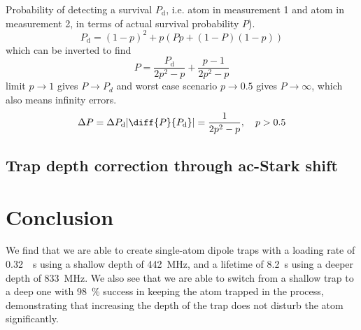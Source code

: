 \documentclass[../Thesis-IJspeert.tex]{subfiles}
\begin{document}
Probability of detecting a survival $P_\text{d}$, i.e. atom in measurement 1 and atom in measurement 2, in terms of actual survival probability $P$).
\begin{equation}
	P_\text{d}=  (1-p)^2 + p\left(Pp + (1-P)(1-p) \right)
\end{equation}
which can be inverted to find
\begin{equation}
	P = \frac{P_\text{d}}{2p^2-p} + \frac{p-1}{2p^2-p}
\end{equation}
limit $p\rightarrow 1$ gives $P\rightarrow P_d$ and worst case scenario $p\rightarrow 0.5$ gives $P\rightarrow \infty$, which also means infinity errors.
\begin{equation}
	\Delta P = \Delta P_\text{d} \left| \diff{P}{P_\text{d}} \right|=\frac{1}{2p^2-p},\hspace{1em} p > 0.5
\end{equation}

\subsection{Trap depth correction through ac-Stark shift}

\iffalse
\begin{figure}[tb]
	\centering
	\texttt{[image: summary.pdf]}
	\caption{}
	\label{fig:singleAtomGraph}
\end{figure}

\begin{figure}[tb]
	\centering
	\texttt{[image: multifit.pdf]}
	\caption{}
	\label{fig:singleAtomGraph}
\end{figure}

\begin{figure}[tb]
	\centering
	\texttt{[image: correctedLT.pdf]}
	\caption{}
	\label{fig:singleAtomGraph}
\end{figure}

\begin{figure}[tb]
	\centering
	\texttt{[image: correctedFR.pdf]}
	\caption{}
	\label{fig:singleAtomGraph}
\end{figure}
\fi

\section{Conclusion}
We find that we are able to create single-atom dipole traps with a loading rate of \SI{0.32}{\per\second} using a shallow depth of \SI{442}{\mega\hertz}, and a lifetime of \SI{8.2}{\second} using a deeper depth of \SI{833}{\mega\hertz}. We also see that we are able to switch from a shallow trap to a deep one with \SI{98}{\percent} success in keeping the atom trapped in the process, demonstrating that increasing the depth of the trap does not disturb the atom significantly. 
\end{document}

